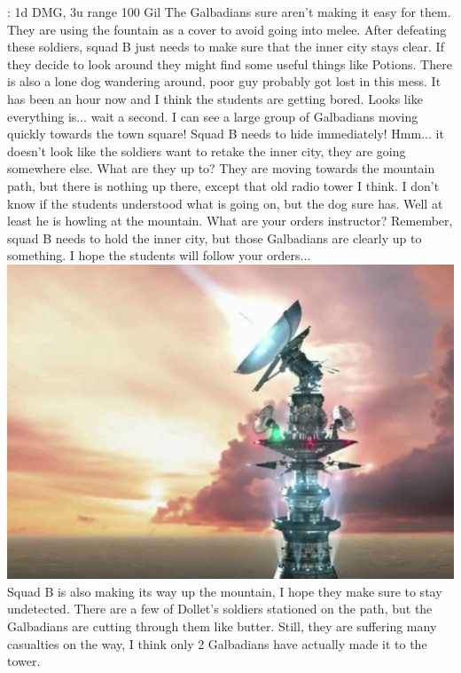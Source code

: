{: 1d DMG, 3u range \hfill {} 100 Gil}{}
%
\vfill
%
The Galbadians sure aren't making it easy for them.
They are using the fountain as a cover to avoid going into melee.  
After defeating these soldiers, squad B just needs to make sure that the inner city stays clear. 
If they decide to look around they might find some useful things like Potions.
There is also a lone dog wandering around, poor guy probably got lost in this mess.
It has been an hour now and I think the students are getting bored. 
Looks like everything is... wait a second.
I can see a large group of Galbadians moving quickly towards the town square!
Squad B needs to hide immediately! 
Hmm... it doesn't look like the soldiers want to retake the inner city, they are going somewhere else.
What are they up to?
%
\vfill
%
They are moving towards the mountain path, but there is nothing up there, except that old radio tower I think.
I don't know if the students understood what is going on, but the dog sure has.
Well at least he is howling at the mountain.
What are your orders instructor?
Remember, squad B needs to hold the inner city, but those Galbadians are clearly up to something.
I hope the students will follow your orders...
%
\clearpage
%
%
\vfill
%
\includegraphics[width=\columnwidth]{./art/siegeofdollet/tower.jpg}
%
\vfill
%
Squad B is also making its way up the mountain, I hope they make sure to stay undetected.
There are a few of Dollet's soldiers stationed on the path, but the Galbadians are cutting through them like butter.
Still, they are suffering many casualties on the way, I think only 2 Galbadians have actually made it to the tower.
